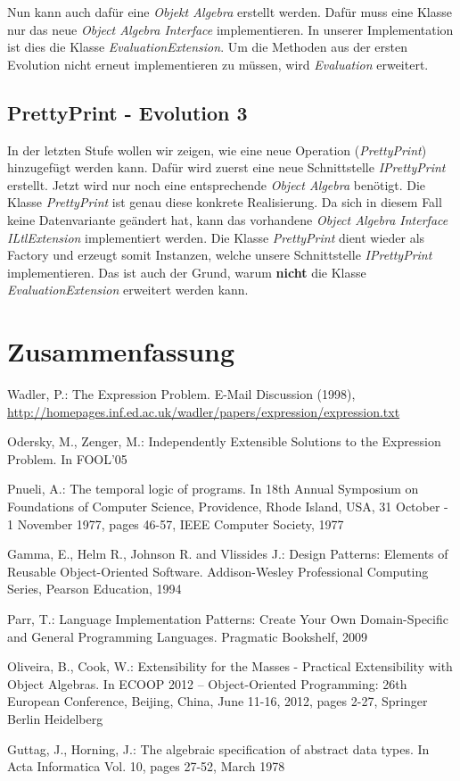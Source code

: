 \documentclass{llncs}
\begin{document}
Nun kann auch dafür eine \emph{Objekt Algebra} erstellt werden.
Dafür muss eine Klasse nur das neue \emph{Object Algebra Interface} implementieren. In unserer Implementation ist dies die Klasse \emph{EvaluationExtension}.
Um die Methoden aus der ersten Evolution nicht erneut implementieren zu müssen, wird \emph{Evaluation} erweitert.

\subsection{PrettyPrint - Evolution 3}
In der letzten Stufe wollen wir zeigen, wie eine neue Operation (\emph{PrettyPrint}) hinzugefügt werden kann. Dafür wird zuerst eine neue Schnittstelle \emph{IPrettyPrint} erstellt.
Jetzt wird nur noch eine entsprechende \emph{Object Algebra} benötigt. Die Klasse \emph{PrettyPrint} ist genau diese konkrete Realisierung.
Da sich in diesem Fall keine Datenvariante geändert hat, kann das vorhandene \emph{Object Algebra Interface} \emph{ILtlExtension} implementiert werden.
Die Klasse \emph{PrettyPrint} dient wieder als Factory und erzeugt somit Instanzen, welche unsere Schnittstelle \emph{IPrettyPrint} implementieren.
Das ist auch der Grund, warum \textbf{nicht} die Klasse \emph{EvaluationExtension} erweitert werden kann.

\section{Zusammenfassung} \label{sec:conclusion}


%
%
\begin{thebibliography}{5}
%

Wadler, P.:
The Expression Problem.
E-Mail Discussion (1998),
\url{http://homepages.inf.ed.ac.uk/wadler/papers/expression/expression.txt}

Odersky, M., Zenger, M.:
Independently Extensible Solutions to the Expression Problem. 
In FOOL'05

Pnueli, A.:
The temporal logic of programs.
In 18th Annual Symposium on Foundations of Computer Science, Providence, Rhode Island, USA, 31 October - 1 November 1977, pages 46-57, IEEE Computer Society, 1977

Gamma, E., Helm R., Johnson R. and Vlissides J.:
Design Patterns: Elements of Reusable Object-Oriented Software.
Addison-Wesley Professional Computing Series, Pearson Education, 1994

Parr, T.:
Language Implementation Patterns: Create Your Own Domain-Specific and General Programming Languages.
Pragmatic Bookshelf, 2009

Oliveira, B., Cook, W.:
Extensibility for the Masses - Practical Extensibility with Object Algebras.
In ECOOP 2012 -- Object-Oriented Programming: 26th European Conference, Beijing, China, June 11-16, 2012, pages 2-27, Springer Berlin Heidelberg

Guttag, J., Horning, J.:
The algebraic specification of abstract data types.
In Acta Informatica Vol. 10, pages 27-52, March 1978

\end{thebibliography}
\end{document}
